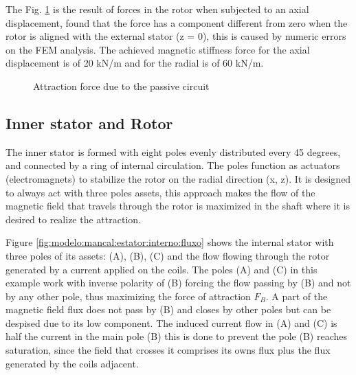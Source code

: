 \documentclass[10pt,fleqn,a4paper,twoside]{article}
\begin{document}
	The Fig. \ref{fig:forca:passivo} is the result of forces in the rotor when subjected to an axial displacement,  found that the force has a component different from zero when the rotor is aligned with the external stator (z = 0), this is caused by numeric errors on the FEM analysis. The achieved magnetic stiffness force for the axial displacement is of 20 kN/m and for the radial is of 60 kN/m. 

	
	\begin{figure}[ht]
		\hfill
		\caption{Attraction force due to the passive circuit}
		\label{fig:forca:passivo}
	\end{figure}	
	
%	
	
	\subsection{Inner stator and Rotor}
	
	The inner stator is formed with eight poles evenly distributed every 45 degrees, and connected by a ring of internal circulation. The poles function as actuators (electromagnets) to stabilize the rotor on the radial direction (x, z).  It is designed to always act with three poles assets, this approach makes the flow of the magnetic field that travels through the rotor is maximized in the shaft where it is desired to realize the attraction.
	
	Figure \ref{fig:modelo:mancal:estator:interno:fluxo} shows the internal stator with three poles of its assets: (A), (B), (C) and the flow flowing through the rotor generated by a current applied on the coils. The poles (A) and (C) in this example work with inverse polarity of (B) forcing the flow passing by (B) and not by any other pole, thus maximizing the force of attraction $F_B$. A part of the magnetic field flux does not pass by (B) and closes by other poles but can be despised due to its low component. The induced current flow in (A) and (C) is half the current in the main pole (B) this is done to prevent the pole (B) reaches saturation, since the field that crosses it comprises its owns flux plus the flux generated by the coils adjacent. 
	
\end{document}
